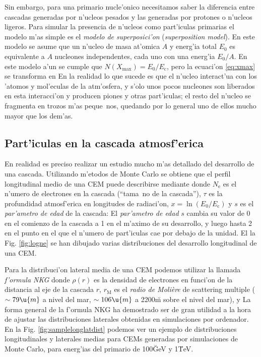 Sin embargo, para una primario nucle'onico necesitamos saber la
diferencia entre cascadas generadas por n'ucleos pesados y las
generadas por protones o n'ucleos ligeros. Para simular la presencia
de n'ucleos como part'iculas primarias el modelo m'as simple es el
\emph{modelo de superposici'on} (\emph{superposition model}). En este
modelo se asume que un n'ucleo de masa at'omica $A$ y energ'ia total
$E_0$ es equivalente a $A$ nucleones independentes, cada uno con una
energ'ia $E_0/A$. En este modelo a'un se cumple que
$N(X_{\mathrm{max}}) = E_0 / E_{\mathrm{c}}$, pero la ecuaci'on
\ref{eq:xmax} se transforma en
%
\NXsimpleHadeq
%
En la realidad lo que sucede es que el n'ucleo interact'ua con los
'atomos y mol'eculas de la atm'osfera, y s'olo unos pocos nucleones
son liberados en esta interacci'on y producen piones y otras
part'iculas; el resto del n'ucleo se fragmenta en trozos m'as
peque~nos, quedando por lo general uno de ellos mucho mayor que los
dem'as.

\lognefig

\subsection{Part'iculas en la cascada atmosf'erica}

En realidad es preciso realizar un estudio mucho m'as detallado del
desarrollo de una cascada. Utilizando m'etodos de Monte Carlo se
obtiene que el perfil longitudinal medio de una CEM puede describirse
mediante
%
\Neeq
%
donde $N_{\mathrm{e}}$ es el n'umero de electrones en la cascada
(``tama~no de la cascada''), $\tau$ es la profundidad atmosf'erica en
longitudes de radiaci'on, $x=\ln(E_0/E_{\mathrm{c}})$ y $s$ es el
\emph{par'ametro de edad} de la cascada:
%
\ageeq
%
El \emph{par'ametro de edad} $s$ cambia su valor de 0 en el comienzo
de la cascada a 1 en el m'aximo de su desarrollo, y luego hasta 2 en
el punto en el que el n'umero de part'iculas cae por debajo de la
unidad. El la Fig. \ref{fig:logne} se han dibujado varias
distribuciones del desarrollo longitudinal de una CEM.

\samplelonglatdistfig

Para la distribuci'on lateral media de una CEM podemos utilizar la
llamada \emph{f'ormula NKG}
%
\NKGeq
%
donde $\rho(r)$ es la densidad de electrones en funci'on de la
distancia al eje de la cascada $r$, $r_{\mathrm{M}}$ es el \emph{radio
de Moli\`ere} de scattering multiple ($\sim 79\u{m}$ a nivel del mar,
$\sim 106\u{m}$ a 2200\u{m} sobre el nivel del mar), y
%
\fsreq
%
La forma general de la f'ormula NKG ha demostrado ser de gran utilidad
a la hora de ajustar las distribuciones laterales obtenidas en
simulaciones por ordenador. En la Fig. \ref{fig:samplelonglatdist}
podemos ver un ejemplo de distribuciones longitudinales y laterales
medias para CEMs generadas por simulaciones de Monte Carlo, para
energ'ias del primario de 100\u{GeV} y 1\u{TeV}.

